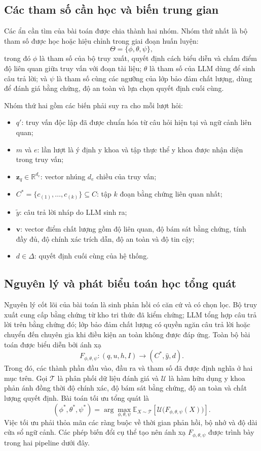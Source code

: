 \subsection{Các tham số cần học và biến trung gian}

Các ẩn cần tìm của bài toán được chia thành hai nhóm. Nhóm thứ nhất là bộ tham số được học hoặc hiệu chỉnh trong giai đoạn huấn luyện:
\[
    \Theta=\{\phi,\theta,\psi\},
\]
trong đó $\phi$ là tham số của bộ truy xuất, quyết định cách biểu diễn và chấm điểm độ liên quan giữa truy vấn với đoạn tài liệu; $\theta$ là tham số của LLM dùng để sinh câu trả lời; và $\psi$ là tham số cùng các ngưỡng của lớp bảo đảm chất lượng, dùng để đánh giá bằng chứng, độ an toàn và lựa chọn quyết định cuối cùng.

Nhóm thứ hai gồm các biến phải suy ra cho mỗi lượt hỏi:
\begin{itemize}
    \item $q'$: truy vấn độc lập đã được chuẩn hóa từ câu hỏi hiện tại và ngữ cảnh liên quan;
    \item $m$ và $e$: lần lượt là ý định y khoa và tập thực thể y khoa được nhận diện trong truy vấn;
    \item $\mathbf{z}_q\in\mathbb{R}^{d_e}$: vector nhúng $d_e$ chiều của truy vấn;
    \item $C^*=\{c_{(1)},\ldots,c_{(k)}\}\subseteq C$: tập $k$ đoạn bằng chứng liên quan nhất;
    \item $\widetilde{y}$: câu trả lời nháp do LLM sinh ra;
    \item $\mathbf{v}$: vector điểm chất lượng gồm độ liên quan, độ bám sát bằng chứng, tính đầy đủ, độ chính xác trích dẫn, độ an toàn và độ tin cậy;
    \item $d\in\Delta$: quyết định cuối cùng của hệ thống.
\end{itemize}

\subsection{Nguyên lý và phát biểu toán học tổng quát}

Nguyên lý cốt lõi của bài toán là sinh phản hồi có căn cứ và có chọn lọc. Bộ truy xuất cung cấp bằng chứng từ kho tri thức đã kiểm chứng; LLM tổng hợp câu trả lời trên bằng chứng đó; lớp bảo đảm chất lượng có quyền ngăn câu trả lời hoặc chuyển đến chuyên gia khi điều kiện an toàn không được đáp ứng. Toàn bộ bài toán được biểu diễn bởi ánh xạ
\[
    F_{\phi,\theta,\psi}:(q,u,h,I)\longrightarrow(C^*,\hat{y},d).
\]
Trong đó, các thành phần đầu vào, đầu ra và tham số đã được định nghĩa ở hai mục trên. Gọi $\mathcal{T}$ là phân phối dữ liệu đánh giá và $\mathcal{U}$ là hàm hữu dụng y khoa phản ánh đồng thời độ chính xác, độ bám sát bằng chứng, độ an toàn và chất lượng quyết định. Bài toán tối ưu tổng quát là
\[
    (\phi^*,\theta^*,\psi^*)
    =\arg\max_{\phi,\theta,\psi}
    \mathbb{E}_{X\sim\mathcal{T}}
    \left[\mathcal{U}\bigl(F_{\phi,\theta,\psi}(X)\bigr)\right].
\]
Việc tối ưu phải thỏa mãn các ràng buộc về thời gian phản hồi, bộ nhớ và độ dài cửa sổ ngữ cảnh. Các phép biến đổi cụ thể tạo nên ánh xạ $F_{\phi,\theta,\psi}$ được trình bày trong hai pipeline dưới đây.

